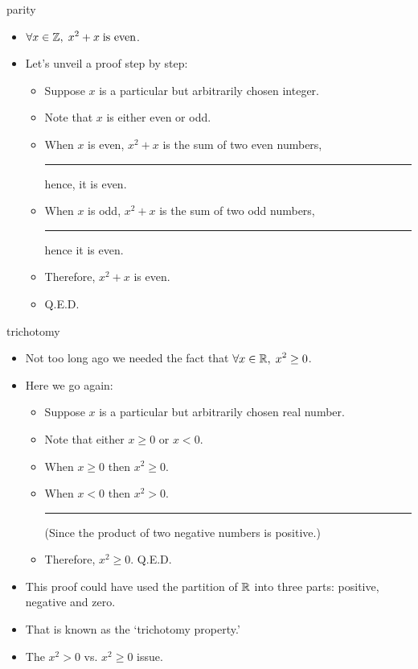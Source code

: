 \documentclass[landscape]{beamer}
\begin{document}
\begin{frame}{parity}
\begin{itemize}
\item $\displaystyle \forall x \in {\mathbb Z}, \; x^2+x \; \mbox{is even}$. \pause
\item Let's unveil a proof step by step:\pause
\begin{itemize}
\item Suppose $x$ is a particular but arbitrarily chosen integer. \pause
\item Note that $x$ is either even or odd. \pause {} \pause \pause
\item When $x$ is even, $x^2 + x$ is the sum of two even numbers, \newline \rule{12pt}{0pt} hence, it is even. \pause
\item When $x$ is odd, $x^2 + x$ is the sum of two odd numbers, \newline \rule{12pt}{0pt} hence it is even.\pause
\item Therefore, $x^2+x$ is even.\pause
\item \hfill Q.E.D. 
\end{itemize}
\end{itemize}
\end{frame}

\begin{frame}{trichotomy}
\begin{itemize}
\item Not too long ago we needed the fact that $\displaystyle \forall x \in {\mathbb R}, \; x^2 \geq 0$. \pause
\item Here we go again: \pause
\begin{itemize}
\item Suppose $x$ is a particular but arbitrarily chosen real number. \pause
\item Note that either $x\geq 0$ or $x<0$. \pause
\item When $x \geq 0$ then $x^2 \geq 0$. \pause
\item When $x < 0$ then $x^2 > 0$. \pause \newline \rule{12pt}{0pt} (Since the product of two negative numbers is positive.) \pause
\item Therefore, $x^2 \geq 0$. \hfill Q.E.D. \pause
\end{itemize}
\item This proof could have used the partition of ${\mathbb R}$ into three parts: positive, negative and zero. \pause
\item That is known as the `trichotomy property.' \pause
\item The $x^2 > 0$ vs. $x^2 \geq 0$ issue.
\end{itemize}
\end{frame}
\end{document}
